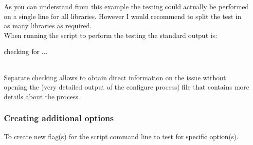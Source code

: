 \noindent As you can understand from this example the testing could actually be performed on a single line for all libraries. 
However I would recommend to split the test in as many libraries as required. \\[0.25cm]
When running the  script to perform the testing the standard output is:
{\footnotesize{
\begin{script}
checking for ... 
\end{script}
}}
\\[-0.5cm]
\noindent Separate checking allows to obtain direct information on the issue without opening the  (very detailed output of the configure process) 
file that contains more details about the process.
\newpage

\subsubsection{Creating additional  options}

To create new flag(s) for the  script command line to test for specific option(s). 

